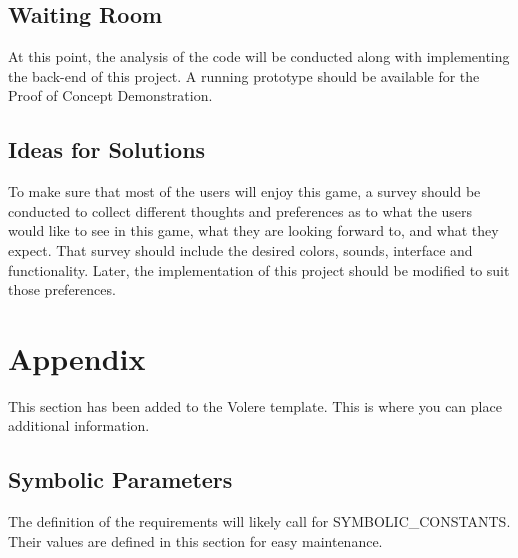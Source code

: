 \documentclass[12pt, titlepage]{article}
\begin{document}
\subsection{Waiting Room}
At this point, the analysis of the code will be conducted along with implementing the back-end of this project. A running prototype should be available for the Proof of Concept Demonstration.

\subsection{Ideas for Solutions}
To make sure that most of the users will enjoy this game, a survey should be conducted to collect different thoughts and preferences as to what the users would like to see in this game, what they are looking forward to, and what they expect. That survey should include the desired colors, sounds, interface and functionality. Later, the implementation of this project should be modified to suit those preferences.



\newpage
\section{Appendix}
This section has been added to the Volere template.  This is where you can place
additional information.
\subsection{Symbolic Parameters}
The definition of the requirements will likely call for SYMBOLIC\_CONSTANTS.
Their values are defined in this section for easy maintenance.
\end{document}
